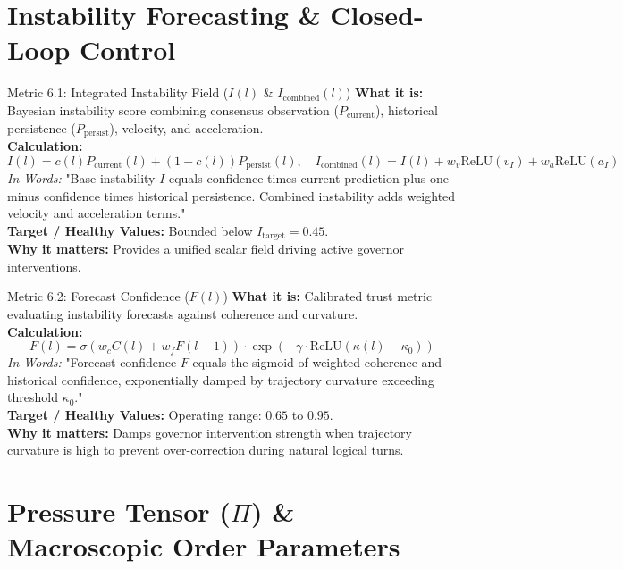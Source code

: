 \documentclass[10pt,a4paper]{article}
\begin{document}
\section{Instability Forecasting \& Closed-Loop Control}

\begin{metricbox}{Metric 6.1: Integrated Instability Field ($I(l)$ \& $I_{\text{combined}}(l)$)}
\textbf{What it is:} Bayesian instability score combining consensus observation ($P_{\text{current}}$), historical persistence ($P_{\text{persist}}$), velocity, and acceleration.\\
\textbf{Calculation:}
$$I(l) = c(l) P_{\text{current}}(l) + (1-c(l)) P_{\text{persist}}(l), \quad I_{\text{combined}}(l) = I(l) + w_v \text{ReLU}(v_I) + w_a \text{ReLU}(a_I)$$
\emph{In Words:} "Base instability $I$ equals confidence times current prediction plus one minus confidence times historical persistence. Combined instability adds weighted velocity and acceleration terms."\\
\textbf{Target / Healthy Values:} Bounded below $I_{\text{target}} = 0.45$.\\
\textbf{Why it matters:} Provides a unified scalar field driving active governor interventions.
\end{metricbox}

\begin{metricbox}{Metric 6.2: Forecast Confidence ($F(l)$)}
\textbf{What it is:} Calibrated trust metric evaluating instability forecasts against coherence and curvature.\\
\textbf{Calculation:}
$$F(l) = \sigma\left(w_c C(l) + w_f F(l-1)\right) \cdot \exp\left(-\gamma \cdot \text{ReLU}(\kappa(l) - \kappa_0)\right)$$
\emph{In Words:} "Forecast confidence $F$ equals the sigmoid of weighted coherence and historical confidence, exponentially damped by trajectory curvature exceeding threshold $\kappa_0$."\\
\textbf{Target / Healthy Values:} Operating range: $0.65$ to $0.95$.\\
\textbf{Why it matters:} Damps governor intervention strength when trajectory curvature is high to prevent over-correction during natural logical turns.
\end{metricbox}

\section{Pressure Tensor ($\Pi$) \& Macroscopic Order Parameters}
\end{document}
